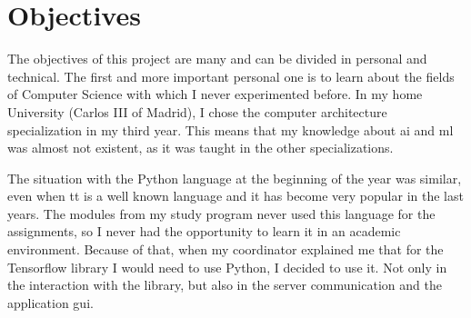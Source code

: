 %
%

\section{Objectives}
The objectives of this project are many and can be divided in personal and technical. The first and more important personal one is to learn about the fields of Computer Science with which I never experimented before. In my home University (Carlos III of Madrid), I chose the computer architecture specialization in my third year. This means that my knowledge about \gls{ai} and \gls{ml} was almost not existent, as it was taught in the other specializations. 

The situation with the Python language at the beginning of the year was similar, even when tt is a well known language and it has become very popular in the last years. The modules from my study program never used this language for the assignments, so I never had the opportunity to learn it in an academic environment. Because of that, when my coordinator explained me that for the Tensorflow library I would need to use Python, I decided to use it. Not only in the interaction with the library, but also in the server communication and the application \gls{gui}.


